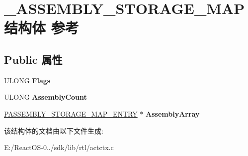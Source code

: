 \hypertarget{struct___a_s_s_e_m_b_l_y___s_t_o_r_a_g_e___m_a_p}{}\section{\+\_\+\+A\+S\+S\+E\+M\+B\+L\+Y\+\_\+\+S\+T\+O\+R\+A\+G\+E\+\_\+\+M\+A\+P结构体 参考}
\label{struct___a_s_s_e_m_b_l_y___s_t_o_r_a_g_e___m_a_p}
\subsection*{Public 属性}
\begin{DoxyCompactItemize}
\item 
\mbox{\label{struct___a_s_s_e_m_b_l_y___s_t_o_r_a_g_e___m_a_p_a13b7aed9ddf60340ee8b8f949e17397f}} 
U\+L\+O\+NG {\bfseries Flags}
\item 
\mbox{\label{struct___a_s_s_e_m_b_l_y___s_t_o_r_a_g_e___m_a_p_a9c2bf2bf37e146b4260152b9da16be05}} 
U\+L\+O\+NG {\bfseries Assembly\+Count}
\item 
\mbox{\label{struct___a_s_s_e_m_b_l_y___s_t_o_r_a_g_e___m_a_p_ac4bb4b6ead4f88de1d3d20c8e497ba90}} 
\hyperlink{struct___a_s_s_e_m_b_l_y___s_t_o_r_a_g_e___m_a_p___e_n_t_r_y}{P\+A\+S\+S\+E\+M\+B\+L\+Y\+\_\+\+S\+T\+O\+R\+A\+G\+E\+\_\+\+M\+A\+P\+\_\+\+E\+N\+T\+RY} $\ast$ {\bfseries Assembly\+Array}
\end{DoxyCompactItemize}


该结构体的文档由以下文件生成\+:\begin{DoxyCompactItemize}
\item 
E\+:/\+React\+O\+S-\/0../sdk/lib/rtl/actctx.\+c\end{DoxyCompactItemize}
